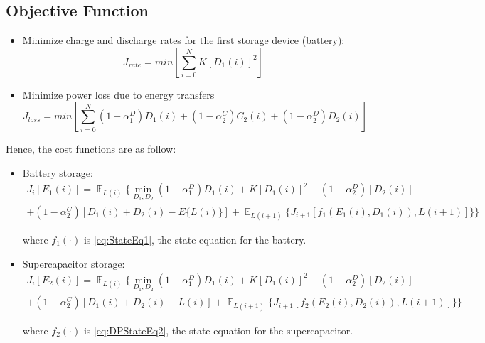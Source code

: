 \documentclass{article}
\begin{document}
	\subsection{Objective Function}
	\begin{itemize}
		\item Minimize charge and discharge rates
		 for the first storage device (battery):
		 \begin{equation}J_{rate}=min\left[\sum_{i=0}^{N}K\left[D_{1}(i)\right]^{2}\right]\end{equation}
 		\item Minimize power loss due to energy transfers
		 \begin{equation}J_{loss}=min\left[\sum_{i=0}^{N}
		 (1-\alpha_{1}^{D})D_{1}(i)+
		 (1-\alpha_{2}^{C})C_{2}(i)+
 		 (1-\alpha_{2}^{D})D_{2}(i)
		  \right]\end{equation}
	\end{itemize}
	
	Hence, the cost functions are as follow:
	  
	\begin{itemize}
		  \item Battery storage:\\
		  \begin{multline}
		  J_{i}[E_{1}(i)] = \mathop{\mathbb{E}}_{L(i)}
		  \{\min_{D_{1},D_{2}}
		  (1-\alpha_{1}^{D})D_{1}(i) 
		  	+ K[D_{1}(i)]^{2}
		  	+(1-\alpha_{2}^{D})[D_{2}(i)]\\	  +(1-\alpha_{2}^{C})[D_{1}(i)+D_{2}(i)-E\{L(i)\}]
		  	+\mathop{\mathbb{E}}_{L(i+1)}\{J_{i+1}[f_{1}(E_{1}(i),D_{1}(i)),L(i+1)]\}\}
		  \end{multline}
		  
		  where $f_{1}(\cdot)$ is \eqref{eq:StateEq1}, the state equation for the battery.
		  
		  \item Supercapacitor storage:\\
		  \begin{multline}
		  J_{i}[E_{2}(i)] = \mathop{\mathbb{E}}_{L(i)} \{\min_{D_{1},D_{2}}
		  (1-\alpha_{1}^{D})D_{1}(i) 
		  	+ K[D_{1}(i)]^{2}
		  	+(1-\alpha_{2}^{D})[D_{2}(i)]\\	  +(1-\alpha_{2}^{C})[D_{1}(i)+D_{2}(i)-L(i)]
		  	+\mathop{\mathbb{E}}_{L(i+1)} \{J_{i+1}[f_{2}(E_{2}(i),D_{2}(i)),L(i+1)]\}\}
		  \end{multline}
		  
		  where $f_{2}(\cdot)$ is \eqref{eq:DPStateEq2}, the state equation for the supercapacitor.
	\end{itemize}
	
	
	
\end{document}
